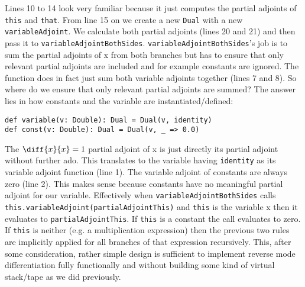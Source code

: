 Lines 10 to 14 look very familiar because it just computes the partial adjoints of \lstinline{this} and \lstinline{that}. From line 15 on we create a new \lstinline{Dual} with a new \lstinline{variableAdjoint}.  We calculate both partial adjoints (lines 20 and 21) and then pass it to \lstinline{variableAdjointBothSides}. \lstinline{variableAdjointBothSides}'s job is to sum the partial adjoints of x from both branches but has to ensure that only relevant partial adjoints are included and for example constants are ignored. The function does in fact just sum both variable adjoints together (lines 7 and 8). So where do we ensure that only relevant partial adjoints are summed? The answer lies in how constants and the variable are instantiated/defined:
\begin{lstlisting}
def variable(v: Double): Dual = Dual(v, identity)
def const(v: Double): Dual = Dual(v, _ => 0.0)
\end{lstlisting}
The $\diff{x}{x} = 1$ partial adjoint of x is just directly its partial adjoint without further ado. This translates to the variable having \lstinline{identity} as its variable adjoint function (line 1). The variable adjoint of constants are always zero (line 2). This makes sense because constants have no meaningful partial adjoint for our variable. Effectively when \lstinline{variableAdjointBothSides} calls \lstinline{this.variableAdjoint(partialAdjointThis)} and \lstinline{this} is the variable x then it evaluates to \lstinline{partialAdjointThis}. If \lstinline{this} is a constant the call evaluates to zero. If \lstinline{this} is neither (e.g. a multiplication expression) then the previous two rules are implicitly applied for all branches of that expression recursively. This, after some consideration, rather simple design is sufficient to implement reverse mode differentiation fully functionally and without building some kind of virtual stack/tape as we did previously.

